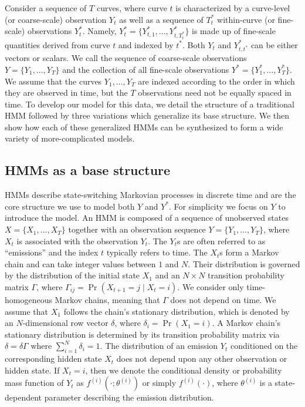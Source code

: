 
Consider a sequence of $T$ curves, where curve $t$ is characterized by a curve-level (or coarse-scale) observation $Y_t$ as well as a sequence of $T^*_t$ within-curve (or fine-scale) observations $Y^*_{t}$. Namely, $Y^*_{t} = \big\{Y^*_{t,1},\ldots,Y^*_{t,T^*_t}\big\}$ is made up of fine-scale quantities derived from curve $t$ and indexed by $t^*$. Both $Y_t$ and $Y^*_{t,t^*}$ can be either vectors or scalars. We call the sequence of coarse-scale observations $Y = \big\{Y_1, \ldots, Y_T\big\}$ and the collection of all fine-scale observations $Y^* = \big\{Y^*_1,\ldots,Y^*_T \big\}$. We assume that the curves $Y_1,\ldots,Y_T$ are indexed according to the order in which they are observed in time, but the $T$ observations need not be equally spaced in time. To develop our model for this data, we detail the structure of a traditional HMM followed by three variations which generalize its base structure. We then show how each of these generalized HMMs can be synthesized to form a wide variety of more-complicated models.

\subsection{HMMs as a base structure}
\label{subsec:HMM}

HMMs describe state-switching Markovian processes in discrete time and are the core structure we use to model both $Y$ and $Y^*$. For simplicity we focus on $Y$ to introduce the model. An HMM is composed of a sequence of unobserved states $X = \big\{X_1, \ldots, X_T\big\}$ together with an observation sequence $Y = \big\{Y_1, \ldots, Y_T\big\}$, where $X_t$ is associated with the observation $Y_t$. The $Y_t$s are often referred to as ``emissions'' and the index $t$ typically refers to time. 
The $X_t$s form a Markov chain and can take integer values between $1$ and $N$. Their distribution is governed by the distribution of the initial state $X_1$ and an $N \times N$ transition probability matrix $\Gamma$, where $\Gamma_{ij} = \Pr(X_{t+1} = j \mid X_t = i)$. We consider only time-homogeneous Markov chains, meaning that $\Gamma$ does not depend on time.
%
We assume that $X_1$ follows the chain's stationary distribution, which is denoted by an $N$-dimensional row vector $\delta$, where
$\delta_i = \Pr(X_1 = i).$
A Markov chain's stationary distribution is determined by its transition probability matrix via $\delta = \delta \Gamma$ where $\sum_{i=1}^N \delta_i = 1$.
%
The distribution of an emission $Y_t$ conditioned on the corresponding hidden state $X_t$ does not depend upon any other observation or hidden state.
%
If $X_t=i$, then we denote the conditional density or probability mass function of $Y_t$ as $f^{(i)}(\cdot ; \theta^{(i)})$ or simply $f^{(i)}(\cdot)$, where $\theta^{(i)}$ is a state-dependent parameter describing the emission distribution.
%

